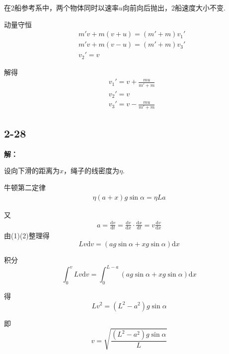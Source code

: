 \documentclass[twocolumn]{ctexart}
\newcommand{\sol}[1]{\subsection*{#1}\noindent\textbf{解：}

}
\begin{document}
	在2船参考系中，两个物体同时以速率$u$向前向后抛出，2船速度大小不变.
	
	动量守恒
	\begin{align*}
		&m'v+m(v+u)=\left(m'+m\right)v_1'\\
		&m'v+m(v-u)=\left(m'+m\right)v_3'\\
		&v_2'=v
	\end{align*}

	解得
	\begin{align*}
		&v_1'=v+\frac{mu}{m'+m}\\
		&v_2'=v\\
		&v_3'=v-\frac{mu}{m'+m}
	\end{align*}
	
	\sol{2-28}
	设向下滑的距离为$x$，绳子的线密度为$\eta$.
	
	牛顿第二定律
	\setcounter{equation}{0}
	\begin{align}
		\eta(a+x)g\sin\alpha=\eta La
	\end{align}
	
	又
	\begin{align}
		a=\frac{\mathrm{d}v}{\mathrm{d}t}=\frac{\mathrm{d}v}{\mathrm{d}x}\cdot\frac{\mathrm{d}x}{\mathrm{d}t}=v\frac{\mathrm{d}v}{\mathrm{d}x}
	\end{align}
	由(1)(2)整理得
	$$Lv\mathrm{d}v=(ag\sin\alpha+xg\sin\alpha)\mathrm{d}x$$
	
	积分
	$$\int_{0}^{v}Lv\mathrm{d}v=\int_{0}^{L-a}(ag\sin\alpha+xg\sin\alpha)\mathrm{d}x$$
	
	得
	$$Lv^2=\left(L^2-a^2\right)g\sin\alpha$$
	
	即
	$$v=\sqrt{\frac{\left(L^2-a^2\right)g\sin\alpha}{L}}$$
\end{document}
